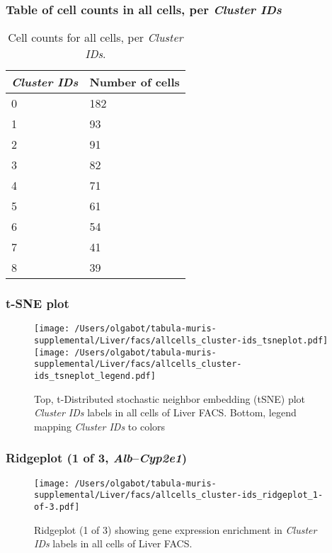 \subsubsection{Table of cell counts in all cells, per \emph{Cluster IDs}}\begin{table}[h]
\centering
\label{my-label}
\begin{tabular}{@{}ll@{}}
\toprule

\emph{Cluster IDs}& Number of cells \\ \midrule
0 & 182 \\

1 & 93 \\

2 & 91 \\

3 & 82 \\

4 & 71 \\

5 & 61 \\

6 & 54 \\

7 & 41 \\

8 & 39 \\
\bottomrule
\end{tabular}
\caption{Cell counts for all cells, per \emph{Cluster IDs}.}
\end{table}

\clearpage
\subsubsection{t-SNE plot}
\begin{figure}[h]
\centering
\texttt{[image: /Users/olgabot/tabula-muris-supplemental/Liver/facs/allcells\_cluster-ids\_tsneplot.pdf]}
\texttt{[image: /Users/olgabot/tabula-muris-supplemental/Liver/facs/allcells\_cluster-ids\_tsneplot\_legend.pdf]}
\caption{Top, t-Distributed stochastic neighbor embedding (tSNE) plot  \emph{Cluster IDs} labels in all cells of Liver FACS. Bottom, legend mapping \emph{Cluster IDs} to colors}
\end{figure}


\clearpage

\subsubsection{Ridgeplot (1 of 3, \emph{Alb}--\emph{Cyp2e1})}
\begin{figure}[h]
\centering
\texttt{[image: /Users/olgabot/tabula-muris-supplemental/Liver/facs/allcells\_cluster-ids\_ridgeplot\_1-of-3.pdf]}

\caption{ Ridgeplot (1 of 3)  showing gene expression enrichment in \emph{Cluster IDs} labels in all cells of Liver FACS. }
\end{figure}


